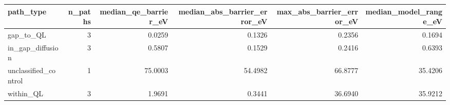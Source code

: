 \begin{tabular}{lrrrrr}
\toprule
path_type & n_paths & median_qe_barrier_eV & median_abs_barrier_error_eV & max_abs_barrier_error_eV & median_model_range_eV \\
\midrule
gap_to_QL & 3 & 0.0259 & 0.1326 & 0.2356 & 0.1694 \\
in_gap_diffusion & 3 & 0.5807 & 0.1529 & 0.2416 & 0.6393 \\
unclassified_control & 1 & 75.0003 & 54.4982 & 66.8777 & 35.4206 \\
within_QL & 3 & 1.9691 & 0.3441 & 36.6940 & 35.9212 \\
\bottomrule
\end{tabular}
